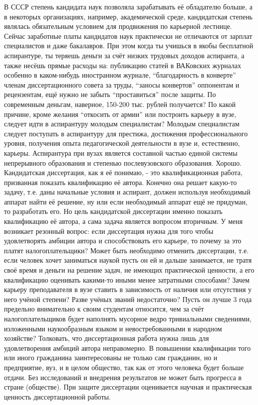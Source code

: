 \begin{drama}
	\maxspeaks В СССР степень кандидата наук позволяла зарабатывать её обладателю больше, а в некоторых организациях, например, академической среде, кандидатская степень являлась обязательным условием для продвижения по карьерной лестнице. Сейчас заработные платы кандидатов наук практически не отличаются от зарплат специалистов и даже бакалавров. При этом когда ты учишься в якобы бесплатной аспирантуре, ты теряешь деньги за счёт низких трудовых доходов аспиранта, а также несёшь прямые расходы на: публикацию статей в ВАКовских журналах особенно в каком-нибудь иностранном журнале, “благодарность в конверте” членам диссертационного совета за труды, “заносы конвертов” оппонентам и рецензентам, ещё нужно не забыть “проставиться” после защиты. По современным деньгам, наверное, 150-200 тыс. рублей получается? По какой причине, кроме желания “откосить от армии” или построить карьеру в вузе, следует идти в аспирантуру молодым специалистам?
	\michaelspeaks Молодым специалистам следует поступать в аспирантуру для престижа, достижения профессионального уровня, получения опыта педагогической деятельности в вузе и, естественно, карьеры. Аспирантура при вузах является составной частью единой системы непрерывного образования и степенью послевузовского образования.
	\maxspeaks Хорошо. Кандидатская диссертация, как я её понимаю, - это квалификационная работа, призванная показать квалификацию её автора. Конечно она решает какую-то задачу, т.е. даны начальные условия и аспирант, должен используя необходимый аппарат найти её решение, ну или если необходимый аппарат ещё не придуман, то разработать его. Но цель кандидатской диссертации именно показать квалификацию её автора, а сама задача является вопросом вторичным. У меня возникает резонный вопрос: если диссертация нужна для того чтобы удовлетворять амбиции автора и способствовать его карьере, то почему за это платят налогоплательщики? Может быть необходимо отменить диссертации, т.е. если человек хочет заниматься наукой пусть он ей и дальше занимается, не тратя своё время и деньги на решение задач, не имеющих практической ценности, а его квалификацию оценивать какими-то иными менее затратными способами? Зачем карьеру преподавателя в вузе ставить в зависимость от наличия или отсутствия у него учёной степени? Разве учёных званий недостаточно? Пусть он лучше 3 года предельно внимательно к своим студентам относится, чем за счёт налогоплательщиков будет наполнять мусорное ведро тривиальными сведениями, изложенными наукообразным языком и невостребованными в народном хозяйстве?
	\michaelspeaks Толковать, что диссертационная работа нужна лишь для удовлетворения амбиций автора неправомерно. В повышении квалификации того или иного гражданина заинтересованы не только сам гражданин, но и предприятие, вуз, и в целом общество, так как от этого человека будет больше отдачи. Без исследований и внедрения результатов не может быть прогресса в стране (обществе). При защите диссертации оценивается научная и практическая ценность диссертационной работы.

\end{drama}
